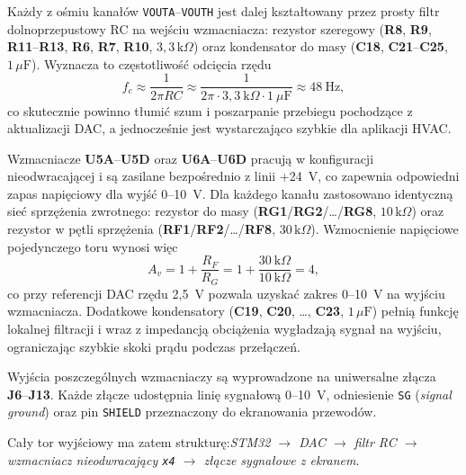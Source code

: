 Każdy z ośmiu kanałów \texttt{VOUTA}--\texttt{VOUTH} jest dalej kształtowany przez prosty filtr dolnoprzepustowy RC na wejściu wzmacniacza: rezystor szeregowy (\textbf{R8}, \textbf{R9}, \textbf{R11}--\textbf{R13}, \textbf{R6}, \textbf{R7}, \textbf{R10}, \(3{,}3\,\mathrm{k}\Omega\)) oraz kondensator do masy (\textbf{C18}, \textbf{C21}--\textbf{C25}, \(1\,\mu\mathrm{F}\)). Wyznacza to częstotliwość odcięcia rzędu
\[
f_c \approx \frac{1}{2\pi R C} \approx \frac{1}{2\pi \cdot 3{,}3\ \mathrm{k}\Omega \cdot 1\ \mu\mathrm{F}} \approx 48\ \mathrm{Hz},
\]
co skutecznie powinno tłumić szum i poszarpanie przebiegu pochodzące z aktualizacji DAC, a jednocześnie jest wystarczająco szybkie dla aplikacji HVAC.

Wzmacniacze \textbf{U5A}--\textbf{U5D} oraz \textbf{U6A}--\textbf{U6D} pracują w konfiguracji nieodwracającej i są zasilane bezpośrednio z linii \mbox{+24~V}, co zapewnia odpowiedni zapas napięciowy dla wyjść \mbox{0--10~V}. Dla każdego kanału zastosowano identyczną sieć sprzężenia zwrotnego: rezystor do masy (\textbf{RG1}/\textbf{RG2}/\dots/\textbf{RG8}, \(10\,\mathrm{k}\Omega\)) oraz rezystor w pętli sprzężenia (\textbf{RF1}/\textbf{RF2}/\dots/\textbf{RF8}, \(30\,\mathrm{k}\Omega\)). Wzmocnienie napięciowe pojedynczego toru wynosi więc
\[
A_v = 1 + \frac{R_F}{R_G} = 1 + \frac{30\ \mathrm{k}\Omega}{10\ \mathrm{k}\Omega} = 4,
\]
co przy referencji DAC rzędu \mbox{2{,}5~V} pozwala uzyskać zakres \mbox{0--10~V} na wyjściu wzmacniacza. Dodatkowe kondensatory (\textbf{C19}, \textbf{C20}, \dots, \textbf{C23}, \(1\,\mu\mathrm{F}\)) pełnią funkcję lokalnej filtracji i wraz z impedancją obciążenia wygładzają sygnał na wyjściu, ograniczając szybkie skoki prądu podczas przełączeń.

Wyjścia poszczególnych wzmacniaczy są wyprowadzone na uniwersalne złącza \textbf{J6}--\textbf{J13}. Każde złącze udostępnia linię sygnałową \mbox{0--10~V}, odniesienie \texttt{SG} (\emph{signal ground}) oraz pin \texttt{SHIELD} przeznaczony do ekranowania przewodów.

Cały tor wyjściowy ma zatem strukturę:\newline \emph{STM32 $\rightarrow$ DAC $\rightarrow$ filtr RC  $\rightarrow$ wzmacniacz nieodwracający \texttt{x4} $\rightarrow$ złącze sygnałowe z ekranem}.
